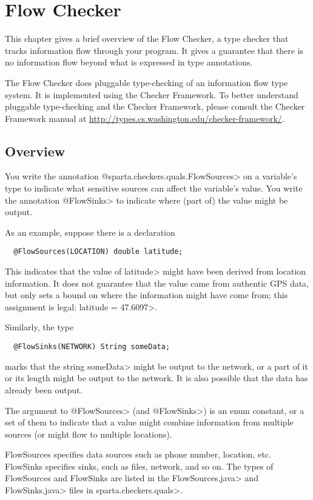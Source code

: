 \htmlhr
\chapter{Flow Checker\label{flow-checker}}

This chapter gives a brief overview of the Flow Checker, a type checker that 
tracks information flow through your program.  It gives a guarantee that there
 is no information flow beyond what is expressed in type annotations.

The Flow Checker does pluggable type-checking of an information flow type
system.  It is implemented using the Checker Framework.  To better
understand pluggable type-checking and the Checker Framework, please
consult the Checker Framework manual at
\url{http://types.cs.washington.edu/checker-framework/}.  

\section{Overview}

You write the annotation \<@sparta.checkers.quals.FlowSources> on a variable's
type to indicate what sensitive sources can affect the variable's value.
You write the annotation \<@FlowSinks> to indicate where (part of) the
value might be output.

As an example, suppose there is a declaration
\begin{Verbatim}
  @FlowSources(LOCATION) double latitude;
\end{Verbatim}
\noindent
This indicates that the value of \<latitude> might have been derived from
location information.  It does not guarantee that the value came from
authentic GPS data, but only sets a bound on where the information might
have come from; this assignment is legal: \<latitude = 47.6097>.

Similarly, the type
\begin{Verbatim}
  @FlowSinks(NETWORK) String someData;
\end{Verbatim}
\noindent
marks that the string \<someData> might be output to the network, or a part
of it or its length might be output to the network.  It is also possible
that the data has already been output.

The argument to \<@FlowSources> (and \<@FlowSinks>) is an enum constant, or a
set of them to indicate that a value might combine information from
multiple sources (or might flow to multiple locations).

FlowSources specifies data sources such as phone number, location, 
etc.  FlowSinks specifies sinks, such as files, network, and so on.
The types of FlowSources and FlowSinks are listed in the
\<FlowSources.java> and \<FlowSinks.java> files in \<sparta.checkers.quals>.


